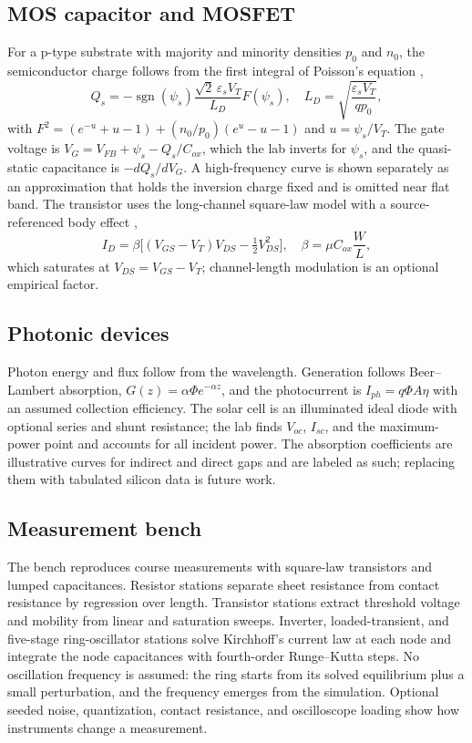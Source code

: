 \documentclass[conference]{IEEEtran}
\begin{document}
\subsection{MOS capacitor and MOSFET}
For a p-type substrate with majority and minority densities $p_0$ and $n_0$, the semiconductor charge follows from the first integral of Poisson's equation \cite{neamen2012},
\begin{equation}
Q_s=-\operatorname{sgn}(\psi_s)\frac{\sqrt2\,\varepsilon_sV_T}{L_D}F(\psi_s),\quad L_D=\sqrt{\frac{\varepsilon_sV_T}{qp_0}},
\end{equation}
with $F^2=(e^{-u}+u-1)+(n_0/p_0)(e^{u}-u-1)$ and $u=\psi_s/V_T$. The gate voltage is $V_G=V_{FB}+\psi_s-Q_s/C_{ox}$, which the lab inverts for $\psi_s$, and the quasi-static capacitance is $-dQ_s/dV_G$. A high-frequency curve is shown separately as an approximation that holds the inversion charge fixed and is omitted near flat band. The transistor uses the long-channel square-law model with a source-referenced body effect \cite{pao1966,brews1978},
\begin{equation}
I_D=\beta\Big[(V_{GS}-V_T)V_{DS}-\tfrac12V_{DS}^2\Big],\quad \beta=\mu C_{ox}\frac{W}{L},
\end{equation}
which saturates at $V_{DS}=V_{GS}-V_T$; channel-length modulation is an optional empirical factor.

\subsection{Photonic devices}
Photon energy and flux follow from the wavelength. Generation follows Beer--Lambert absorption, $G(z)=\alpha\Phi e^{-\alpha z}$, and the photocurrent is $I_{ph}=q\Phi A\eta$ with an assumed collection efficiency. The solar cell is an illuminated ideal diode with optional series and shunt resistance; the lab finds $V_{oc}$, $I_{sc}$, and the maximum-power point and accounts for all incident power. The absorption coefficients are illustrative curves for indirect and direct gaps and are labeled as such; replacing them with tabulated silicon data \cite{green2008} is future work.

\subsection{Measurement bench}
The bench reproduces course measurements with square-law transistors and lumped capacitances. Resistor stations separate sheet resistance from contact resistance by regression over length. Transistor stations extract threshold voltage and mobility from linear and saturation sweeps. Inverter, loaded-transient, and five-stage ring-oscillator stations solve Kirchhoff's current law at each node and integrate the node capacitances with fourth-order Runge--Kutta steps. No oscillation frequency is assumed: the ring starts from its solved equilibrium plus a small perturbation, and the frequency emerges from the simulation. Optional seeded noise, quantization, contact resistance, and oscilloscope loading show how instruments change a measurement.
\end{document}
